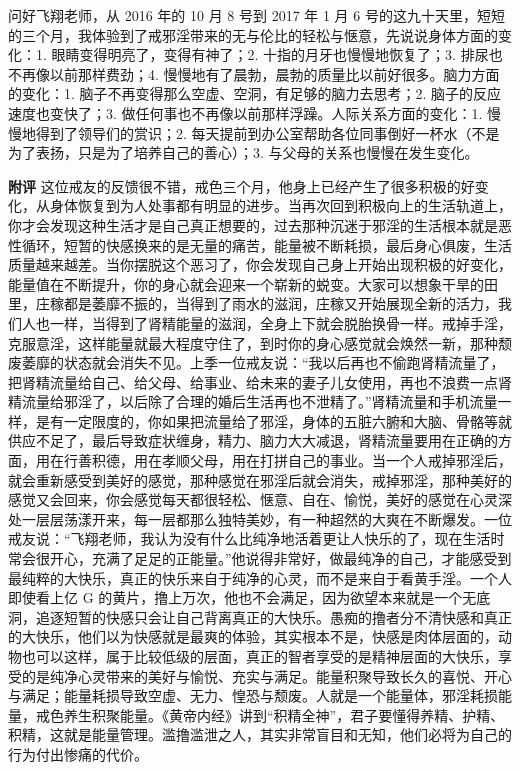 \begin{case}
    问好飞翔老师，从 2016 年的 10 月 8 号到 2017 年 1 月 6 号的这九十天里，短短的三个月，我体验到了戒邪淫带来的无与伦比的轻松与惬意，先说说身体方面的变化：1. 眼睛变得明亮了，变得有神了；2. 十指的月牙也慢慢地恢复了；3. 排尿也不再像以前那样费劲；4. 慢慢地有了晨勃，晨勃的质量比以前好很多。脑力方面的变化：1. 脑子不再变得那么空虚、空洞，有足够的脑力去思考；2. 脑子的反应速度也变快了；3. 做任何事也不再像以前那样浮躁。人际关系方面的变化：1. 慢慢地得到了领导们的赏识；2. 每天提前到办公室帮助各位同事倒好一杯水（不是为了表扬，只是为了培养自己的善心）；3. 与父母的关系也慢慢在发生变化。

    \textbf{附评} 这位戒友的反馈很不错，戒色三个月，他身上已经产生了很多积极的好变化，从身体恢复到为人处事都有明显的进步。当再次回到积极向上的生活轨道上，你才会发现这种生活才是自己真正想要的，过去那种沉迷于邪淫的生活根本就是恶性循环，短暂的快感换来的是无量的痛苦，能量被不断耗损，最后身心俱废，生活质量越来越差。当你摆脱这个恶习了，你会发现自己身上开始出现积极的好变化，能量值在不断提升，你的身心就会迎来一个崭新的蜕变。大家可以想象干旱的田里，庄稼都是萎靡不振的，当得到了雨水的滋润，庄稼又开始展现全新的活力，我们人也一样，当得到了肾精能量的滋润，全身上下就会脱胎换骨一样。戒掉手淫，克服意淫，这样能量就最大程度守住了，到时你的身心感觉就会焕然一新，那种颓废萎靡的状态就会消失不见。上季一位戒友说：“我以后再也不偷跑肾精流量了，把肾精流量给自己、给父母、给事业、给未来的妻子儿女使用，再也不浪费一点肾精流量给邪淫了，以后除了合理的婚后生活再也不泄精了。”肾精流量和手机流量一样，是有一定限度的，你如果把流量给了邪淫，身体的五脏六腑和大脑、骨骼等就供应不足了，最后导致症状缠身，精力、脑力大大减退，肾精流量要用在正确的方面，用在行善积德，用在孝顺父母，用在打拼自己的事业。当一个人戒掉邪淫后，就会重新感受到美好的感觉，那种感觉在邪淫后就会消失，戒掉邪淫，那种美好的感觉又会回来，你会感觉每天都很轻松、惬意、自在、愉悦，美好的感觉在心灵深处一层层荡漾开来，每一层都那么独特美妙，有一种超然的大爽在不断爆发。一位戒友说：“飞翔老师，我认为没有什么比纯净地活着更让人快乐的了，现在生活时常会很开心，充满了足足的正能量。”他说得非常好，做最纯净的自己，才能感受到最纯粹的大快乐，真正的快乐来自于纯净的心灵，而不是来自于看黄手淫。一个人即使看上亿 G 的黄片，撸上万次，他也不会满足，因为欲望本来就是一个无底洞，追逐短暂的快感只会让自己背离真正的大快乐。愚痴的撸者分不清快感和真正的大快乐，他们以为快感就是最爽的体验，其实根本不是，快感是肉体层面的，动物也可以这样，属于比较低级的层面，真正的智者享受的是精神层面的大快乐，享受的是纯净心灵带来的美好与愉悦、充实与满足。能量积聚导致长久的喜悦、开心与满足；能量耗损导致空虚、无力、惶恐与颓废。人就是一个能量体，邪淫耗损能量，戒色养生积聚能量。《黄帝内经》讲到“积精全神”，君子要懂得养精、护精、积精，这就是能量管理。滥撸滥泄之人，其实非常盲目和无知，他们必将为自己的行为付出惨痛的代价。
\end{case}

